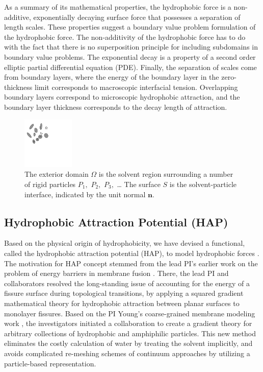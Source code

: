 As a summary of its mathematical properties,  the hydrophobic force
is a non-additive, exponentially decaying surface force 
that possesses a separation of length scales. These properties suggest 
a boundary value problem formulation of the hydrophobic force.  
The non-additivity of the hydrophobic force has to do with the fact that there is no superposition
principle for including subdomains in boundary value problems. 
The exponential decay is a property of a second order elliptic partial differential equation (PDE). 
Finally, the separation of scales come from boundary layers, 
where the energy of the boundary layer in the zero-thickness limit corresponds to macroscopic interfacial tension.
Overlapping boundary layers correspond to microscopic hydrophobic attraction, 
and the boundary layer thickness corresponds to the decay length of attraction.

\begin{figure}
\centerline{\includegraphics[width=0.22\textwidth]{figures/BG_fig1.pdf}}
\caption{The exterior domain $\Omega$ is the solvent region surrounding a
number of rigid particles $P_1,$ $P_2,$ $P_3,$ \dots 
The surface $S$ is the solvent-particle interface, indicated by the unit
normal $\mathbf{n}.$ }\label{fig:domain}
\end{figure}
\subsection{Hydrophobic Attraction Potential (HAP)}
\label{sec:HAP}

Based on the physical origin of hydrophobicity,  we have devised a functional, called the hydrophobic attraction potential (HAP), to
model hydrophobic forces \cite{Fu2018_SIAM}. The motivation for HAP concept stemmed from the lead PI's 
earlier work on the problem of energy barriers in membrane fusion \cite{RyKlYaCo16,Chetal16}.
There, the lead PI and collaborators resolved the long-standing issue of accounting for the energy of a fissure surface
during topological transitions, by applying a squared gradient mathematical theory 
for hydrophobic attraction between planar surfaces \cite{Eriksson1989,Lum1999,Menshikov2017,Marcelja1977} to monolayer fissures.
Based on the PI Young's coarse-grained membrane modeling work \cite{Fu2017}, 
the investigators initiated a collaboration to create a gradient theory for arbitrary collections 
of hydrophobic and amphiphilic particles. This new method 
eliminates the costly calculation of water by treating the solvent implicitly, 
and avoids complicated re-meshing schemes of continuum approaches
by utilizing a particle-based representation.

